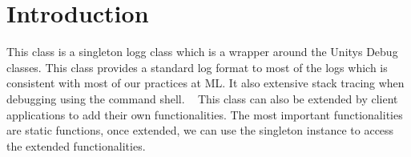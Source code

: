 \hypertarget{index_intro_sec}{}\section{Introduction}\label{index_intro_sec}
This class is a singleton logg class which is a wrapper around the Unity\textquotesingle{}s Debug classes. This class provides a standard log format to most of the logs which is consistent with most of our practices at ML. It also extensive stack tracing when debugging using the command shell. ~\newline
This class can also be extended by client applications to add their own functionalities. The most important functionalities are static functions, once extended, we can use the singleton instance to access the extended functionalities. 